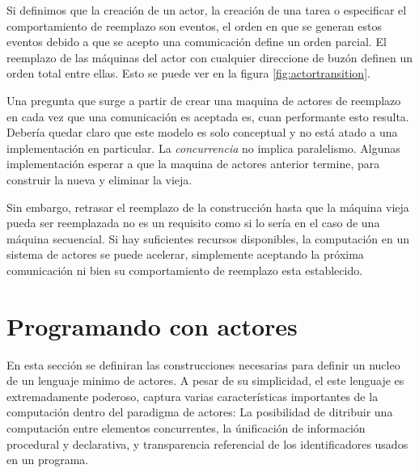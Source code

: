 Si definimos que la creación de un actor, la creación de una tarea o especificar el comportamiento de reemplazo son eventos, el orden en que se generan estos eventos debido a que se acepto una comunicación define un orden parcial. El reemplazo de las máquinas del actor con cualquier direccione de buzón definen un orden total entre ellas. Esto se puede ver en la figura \ref{fig:actortransition}.

Una pregunta que surge a partir de crear una maquina de actores de reemplazo en cada vez que una comunicación es aceptada es, cuan performante esto resulta. Debería quedar claro que este modelo es solo conceptual y no está atado a una implementación en particular. La \textit{concurrencia} no implica paralelismo. Algunas implementación esperar a que la maquina de actores anterior termine, para construir la nueva y eliminar la vieja.

Sin embargo, retrasar el reemplazo de la construcción hasta que la máquina vieja pueda ser reemplazada no es un requisito como si lo sería en el caso de una máquina secuencial. Si hay suficientes recursos disponibles, la computación en un sistema de actores se puede acelerar, simplemente aceptando la próxima comunicación ni bien su comportamiento de reemplazo esta establecido.

% 
% 
% 
% 
% 
% 


\section{Programando con actores}

En esta sección se definiran las construcciones necesarias para definir un nucleo de un lenguaje minimo de actores. A pesar de su simplicidad, el este lenguaje es extremadamente poderoso, captura varias características importantes de la computación dentro del paradigma de actores: La posibilidad de ditribuir una computación entre elementos concurrentes, la únificación de información procedural y declarativa, y transparencia referencial de los identificadores usados en un programa.

